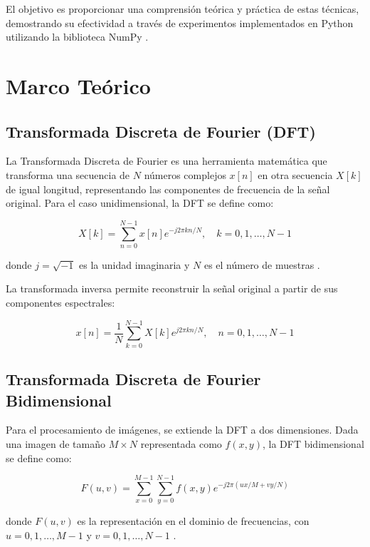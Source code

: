\documentclass[conference]{IEEEtran}
\begin{document}
El objetivo es proporcionar una comprensión teórica y práctica de estas técnicas, demostrando su efectividad a través de experimentos implementados en Python utilizando la biblioteca NumPy \cite{numpy2024}.

\section{Marco Teórico}

\subsection{Transformada Discreta de Fourier (DFT)}

La Transformada Discreta de Fourier es una herramienta matemática que transforma una secuencia de $N$ números complejos $x[n]$ en otra secuencia $X[k]$ de igual longitud, representando las componentes de frecuencia de la señal original. Para el caso unidimensional, la DFT se define como:

\begin{equation}
X[k] = \sum_{n=0}^{N-1} x[n] e^{-j2\pi kn/N}, \quad k = 0, 1, \ldots, N-1
\label{eq:dft1d}
\end{equation}

donde $j = \sqrt{-1}$ es la unidad imaginaria y $N$ es el número de muestras \cite{kulkarni2019}.

La transformada inversa permite reconstruir la señal original a partir de sus componentes espectrales:

\begin{equation}
x[n] = \frac{1}{N} \sum_{k=0}^{N-1} X[k] e^{j2\pi kn/N}, \quad n = 0, 1, \ldots, N-1
\label{eq:idft1d}
\end{equation}

\subsection{Transformada Discreta de Fourier Bidimensional}

Para el procesamiento de imágenes, se extiende la DFT a dos dimensiones. Dada una imagen de tamaño $M \times N$ representada como $f(x,y)$, la DFT bidimensional se define como:

\begin{equation}
F(u,v) = \sum_{x=0}^{M-1} \sum_{y=0}^{N-1} f(x,y) e^{-j2\pi(ux/M + vy/N)}
\label{eq:dft2d}
\end{equation}

donde $F(u,v)$ es la representación en el dominio de frecuencias, con $u = 0, 1, \ldots, M-1$ y $v = 0, 1, \ldots, N-1$ \cite{gonzalez2018}.
\end{document}
